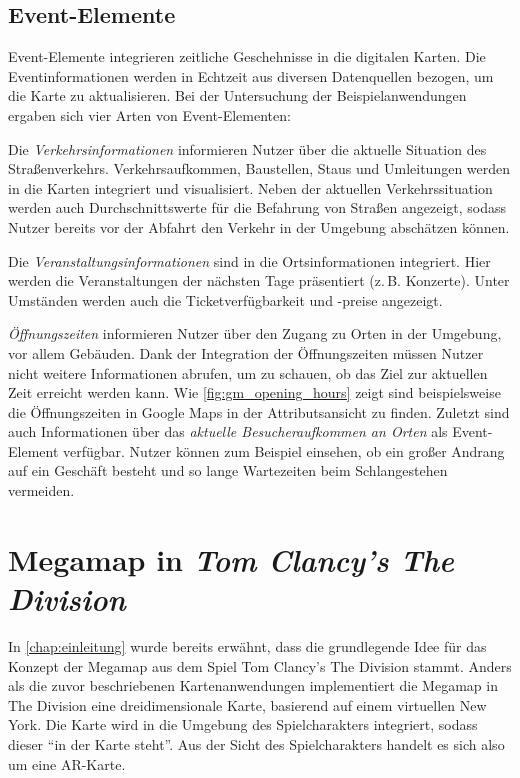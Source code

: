 \subsection{Event-Elemente}
\label{ssec:event-elements}
Event-Elemente integrieren zeitliche Geschehnisse in die digitalen Karten.
Die Eventinformationen werden in Echtzeit aus diversen Datenquellen bezogen, um die Karte zu aktualisieren.
Bei der Untersuchung der Beispielanwendungen ergaben sich vier Arten von Event-Elementen:

Die \emph{Verkehrsinformationen} informieren Nutzer über die aktuelle Situation des Straßenverkehrs.
Verkehrsaufkommen, Baustellen, Staus und Umleitungen werden in die Karten integriert und visualisiert.
Neben der aktuellen Verkehrssituation werden auch Durchschnittswerte für die Befahrung von Straßen angezeigt, sodass Nutzer bereits vor der Abfahrt den Verkehr in der Umgebung abschätzen können.

Die \emph{Veranstaltungsinformationen} sind in die Ortsinformationen integriert.
Hier werden die Veranstaltungen der nächsten Tage präsentiert (z.\,B. Konzerte).
Unter Umständen werden auch die Ticketverfügbarkeit und -preise angezeigt.

\emph{Öffnungszeiten} informieren Nutzer über den Zugang zu Orten in der Umgebung, vor allem Gebäuden.
Dank der Integration der Öffnungszeiten müssen Nutzer nicht weitere Informationen abrufen, um zu schauen, ob das Ziel zur aktuellen Zeit erreicht werden kann.
Wie \autoref{fig:gm_opening_hours} zeigt sind beispielsweise die Öffnungszeiten in Google Maps in der Attributsansicht zu finden.
Zuletzt sind auch Informationen über das \emph{aktuelle Besucheraufkommen an Orten} als Event-Element verfügbar.
Nutzer können zum Beispiel einsehen, ob ein großer Andrang auf ein Geschäft besteht und so lange Wartezeiten beim Schlangestehen vermeiden.

\section{Megamap in \emph{Tom Clancy's The Division}}
In \autoref{chap:einleitung} wurde bereits erwähnt, dass die grundlegende Idee für das Konzept der Megamap aus dem Spiel Tom Clancy's The Division stammt.
Anders als die zuvor beschriebenen Kartenanwendungen implementiert die Megamap in The Division eine dreidimensionale Karte, basierend auf einem virtuellen New York.
Die Karte wird in die Umgebung des Spielcharakters integriert, sodass dieser \enquote{in der Karte steht}.
Aus der Sicht des Spielcharakters handelt es sich also um eine AR-Karte.

